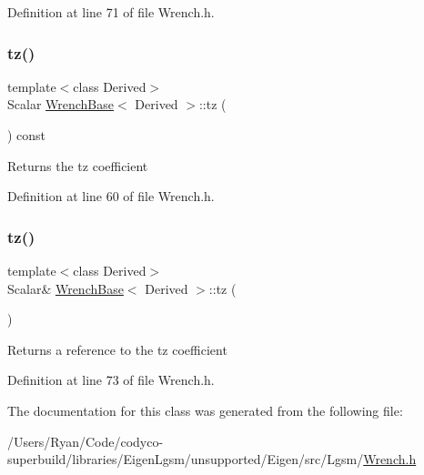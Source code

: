 Definition at line 71 of file Wrench.\+h.

\hypertarget{class_wrench_base_accf6a99e5dd656d46a0e848add0c9e85}{}\label{class_wrench_base_accf6a99e5dd656d46a0e848add0c9e85} 
\subsubsection{\texorpdfstring{tz()}{tz()}\hspace{0.1cm}{\footnotesize\ttfamily [1/2]}}
{\footnotesize\ttfamily template$<$class Derived$>$ \\
Scalar \hyperlink{class_wrench_base}{Wrench\+Base}$<$ Derived $>$\+::tz (\begin{DoxyParamCaption}{ }\end{DoxyParamCaption}) const\hspace{0.3cm}{\ttfamily [inline]}}

\begin{DoxyReturn}{Returns}
the {\ttfamily tz} coefficient 
\end{DoxyReturn}


Definition at line 60 of file Wrench.\+h.

\hypertarget{class_wrench_base_af48dd83f4f8500515b199e42808232a9}{}\label{class_wrench_base_af48dd83f4f8500515b199e42808232a9} 
\subsubsection{\texorpdfstring{tz()}{tz()}\hspace{0.1cm}{\footnotesize\ttfamily [2/2]}}
{\footnotesize\ttfamily template$<$class Derived$>$ \\
Scalar\& \hyperlink{class_wrench_base}{Wrench\+Base}$<$ Derived $>$\+::tz (\begin{DoxyParamCaption}{ }\end{DoxyParamCaption})\hspace{0.3cm}{\ttfamily [inline]}}

\begin{DoxyReturn}{Returns}
a reference to the {\ttfamily tz} coefficient 
\end{DoxyReturn}


Definition at line 73 of file Wrench.\+h.



The documentation for this class was generated from the following file\+:\begin{DoxyCompactItemize}
\item 
/\+Users/\+Ryan/\+Code/codyco-\/superbuild/libraries/\+Eigen\+Lgsm/unsupported/\+Eigen/src/\+Lgsm/\hyperlink{_wrench_8h}{Wrench.\+h}\end{DoxyCompactItemize}
